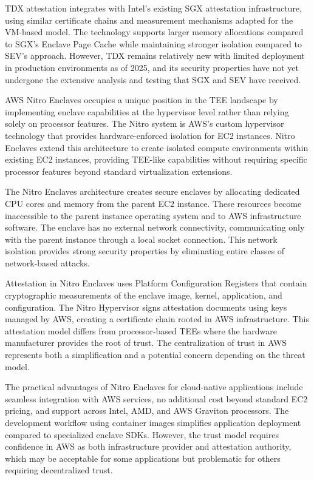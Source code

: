 TDX attestation integrates with Intel's existing SGX attestation infrastructure, using similar certificate chains and measurement mechanisms adapted for the VM-based model. The technology supports larger memory allocations compared to SGX's Enclave Page Cache while maintaining stronger isolation compared to SEV's approach. However, TDX remains relatively new with limited deployment in production environments as of 2025, and its security properties have not yet undergone the extensive analysis and testing that SGX and SEV have received.

AWS Nitro Enclaves occupies a unique position in the TEE landscape by implementing enclave capabilities at the hypervisor level rather than relying solely on processor features. The Nitro system is AWS's custom hypervisor technology that provides hardware-enforced isolation for EC2 instances. Nitro Enclaves extend this architecture to create isolated compute environments within existing EC2 instances, providing TEE-like capabilities without requiring specific processor features beyond standard virtualization extensions.

The Nitro Enclaves architecture creates secure enclaves by allocating dedicated CPU cores and memory from the parent EC2 instance. These resources become inaccessible to the parent instance operating system and to AWS infrastructure software. The enclave has no external network connectivity, communicating only with the parent instance through a local socket connection. This network isolation provides strong security properties by eliminating entire classes of network-based attacks.

Attestation in Nitro Enclaves uses Platform Configuration Registers that contain cryptographic measurements of the enclave image, kernel, application, and configuration. The Nitro Hypervisor signs attestation documents using keys managed by AWS, creating a certificate chain rooted in AWS infrastructure. This attestation model differs from processor-based TEEs where the hardware manufacturer provides the root of trust. The centralization of trust in AWS represents both a simplification and a potential concern depending on the threat model.

The practical advantages of Nitro Enclaves for cloud-native applications include seamless integration with AWS services, no additional cost beyond standard EC2 pricing, and support across Intel, AMD, and AWS Graviton processors. The development workflow using container images simplifies application deployment compared to specialized enclave SDKs. However, the trust model requires confidence in AWS as both infrastructure provider and attestation authority, which may be acceptable for some applications but problematic for others requiring decentralized trust.

